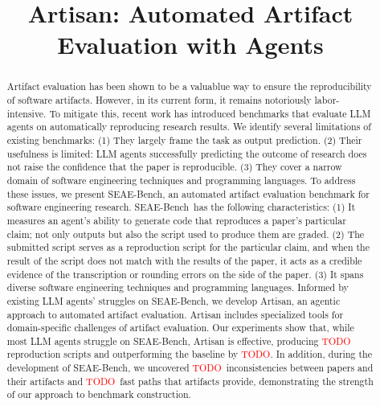 \documentclass[acmsmall,screen,review,anonymous]{acmart}
\begin{document}
\newcommand\benchmark{SEAE-Bench}


\newcommand\todo[1]{\textcolor{red}{TODO: #1}}
\newcommand\artisanpartial{\textcolor{red}{TODO}}
\newcommand\artisanpartialoutperform{\textcolor{red}{TODO}}
\newcommand\inconsistencies{\textcolor{red}{TODO}}
\newcommand\fastpath{\textcolor{red}{TODO}}

\title{Artisan: Automated Artifact Evaluation with Agents}
\begin{abstract}
Artifact evaluation has been shown to be a valuablue way to ensure the reproducibility of software artifacts.
However, in its current form, it remains notoriously labor-intensive.
To mitigate this, recent work has introduced benchmarks that evaluate LLM agents on automatically reproducing research results.
We identify several limitations of existing benchmarks:
(1) They largely frame the task as output prediction.
(2) Their usefulness is limited: LLM agents successfully predicting the outcome of research does not raise the confidence that the paper is reproducible.
(3) They cover a narrow domain of software engineering techniques and programming languages.
To address these issues, we present \benchmark, an automated artifact evaluation benchmark for software engineering research.
\benchmark~has the following characteristics:
(1) It measures an agent’s ability to generate code that reproduces a paper’s particular claim; not only outputs but also the script used to produce them are graded.
(2) The submitted script serves as a reproduction script for the particular claim, and when the result of the script does not match with the results of the paper, it acts as a credible evidence of the transcription or rounding errors on the side of the paper.
(3) It spans diverse software engineering techniques and programming languages.
Informed by existing LLM agents’ struggles on \benchmark, we develop Artisan, an agentic approach to automated artifact evaluation.
Artisan includes specialized tools for domain-specific challenges of artifact evaluation.
Our experiments show that, while most LLM agents struggle on \benchmark, Artisan is effective, producing \artisanpartial{} reproduction scripts and outperforming the baseline by \artisanpartialoutperform{}.
In addition, during the development of \benchmark, we uncovered \inconsistencies{}~inconsistencies between papers and their artifacts and \fastpath~fast paths that artifacts provide, demonstrating the strength of our approach to benchmark construction.
\end{abstract}
\maketitle










\end{document}
